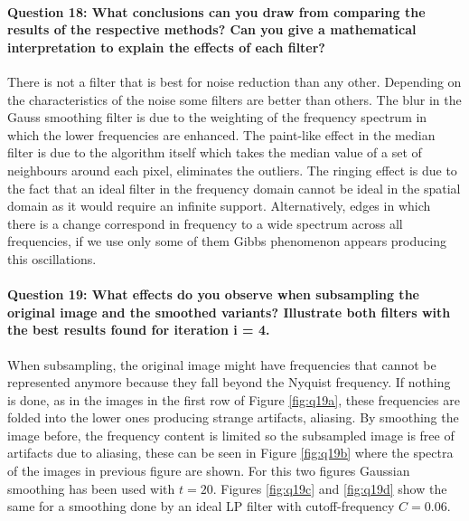 \documentclass[12pt]{article}
\begin{document}
\paragraph{Question 18: What conclusions can you draw from comparing the results of the respective
methods? Can you give a mathematical interpretation to explain the effects of each filter?}
There is not a filter that is best for noise reduction than any other. Depending on the characteristics of the noise some filters are better than others. The blur in the Gauss smoothing filter is due to the weighting of the frequency spectrum in which the lower frequencies are enhanced. The paint-like effect in the median filter is due to the algorithm itself which takes the median value of a set of neighbours around each pixel, eliminates the outliers. The ringing effect is due to the fact that an ideal filter in the frequency domain cannot be ideal in the spatial domain as it would require an infinite support. Alternatively, edges in which there is a change correspond in frequency to a wide spectrum across all frequencies, if we use only some of them Gibbs phenomenon appears producing this oscillations.

\paragraph{Question 19: What effects do you observe when subsampling the original image and the smoothed variants? Illustrate both filters with the best results found for iteration i = 4.}
When subsampling, the original image might have frequencies that cannot be represented anymore because they fall beyond the Nyquist frequency. If nothing is done, as in the images in the first row of Figure \ref{fig:q19a}, these frequencies are folded into the lower ones producing strange artifacts, aliasing. By smoothing the image before, the frequency content is limited so the subsampled image is free of artifacts due to aliasing, these can be seen in Figure \ref{fig:q19b} where the spectra of the images in previous figure are shown. For this two figures Gaussian smoothing has been used with \(t=20\). Figures \ref{fig:q19c} and \ref{fig:q19d} show the same for a smoothing done by an ideal LP filter with cutoff-frequency \(C=0.06\).
\end{document}
